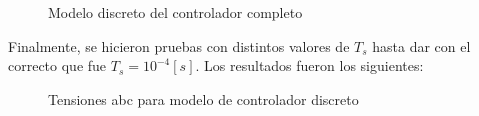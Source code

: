 \documentclass[a4paper, 10pt, onecolumn,journal]{ieeeconf}
\begin{document}
\begin{figure}[H]
	\centering
	\begin{adjustbox}{max width=\columnwidth}
	\end{adjustbox}
	\caption{Modelo discreto del controlador completo}
	\label{Modelo discreto del controlador completo}
\end{figure}
Finalmente, se hicieron pruebas con distintos valores de $T_s$ hasta dar con el correcto que fue $T_s = 10^{-4} [s]$. Los resultados fueron los siguientes:
\begin{figure}[H]
	\centering
	\begin{adjustbox}{max width=\columnwidth}
	\end{adjustbox}
	\caption{Tensiones abc para modelo de controlador discreto}
	\label{Tensiones abc para modelo de controlador discreto}
\end{figure}
\end{document}
